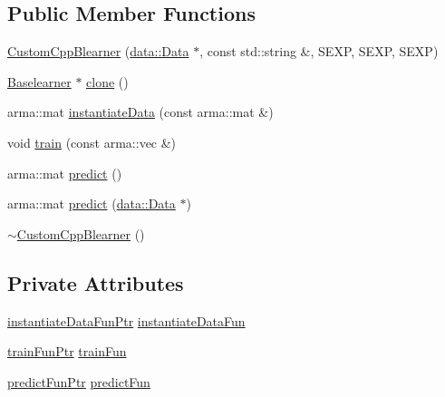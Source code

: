 \subsection*{Public Member Functions}
\begin{DoxyCompactItemize}
\item 
\hyperlink{classblearner_1_1_custom_cpp_blearner_a053eccfff8223ab0358b7f00ed02d263}{Custom\+Cpp\+Blearner} (\hyperlink{classdata_1_1_data}{data\+::\+Data} $\ast$, const std\+::string \&, S\+E\+XP, S\+E\+XP, S\+E\+XP)
\item 
\hyperlink{classblearner_1_1_baselearner}{Baselearner} $\ast$ \hyperlink{classblearner_1_1_custom_cpp_blearner_a8b76705131d397974cd208fdcfd70496}{clone} ()
\item 
arma\+::mat \hyperlink{classblearner_1_1_custom_cpp_blearner_a14607a1d1f312d46a3024b37085c146d}{instantiate\+Data} (const arma\+::mat \&)
\item 
void \hyperlink{classblearner_1_1_custom_cpp_blearner_aa71b777d7092a3d9b47a9bed125eb0f9}{train} (const arma\+::vec \&)
\item 
arma\+::mat \hyperlink{classblearner_1_1_custom_cpp_blearner_aa17db5f5627b8251b2d8484d92e783b9}{predict} ()
\item 
arma\+::mat \hyperlink{classblearner_1_1_custom_cpp_blearner_af2326171640e94c3a00f813781710208}{predict} (\hyperlink{classdata_1_1_data}{data\+::\+Data} $\ast$)
\item 
\hyperlink{classblearner_1_1_custom_cpp_blearner_a4e26b5c9da2eaff19a21de8fdb534bc5}{$\sim$\+Custom\+Cpp\+Blearner} ()
\end{DoxyCompactItemize}
\subsection*{Private Attributes}
\begin{DoxyCompactItemize}
\item 
\hyperlink{namespaceblearner_a10cec16134a934fb9defbdc2c2011f2a}{instantiate\+Data\+Fun\+Ptr} \hyperlink{classblearner_1_1_custom_cpp_blearner_a51d1b6de280bcfa542b1e0cf87ee5bce}{instantiate\+Data\+Fun}
\item 
\hyperlink{namespaceblearner_a5e2b38edf05e32681bee136af9ae505d}{train\+Fun\+Ptr} \hyperlink{classblearner_1_1_custom_cpp_blearner_ac4dd33045cf6c5d0272414325933da9c}{train\+Fun}
\item 
\hyperlink{namespaceblearner_a93d5b51440d434704d2bde9dee652f6e}{predict\+Fun\+Ptr} \hyperlink{classblearner_1_1_custom_cpp_blearner_a3de859c383be2320f1c2a9b4954a91b0}{predict\+Fun}
\end{DoxyCompactItemize}
